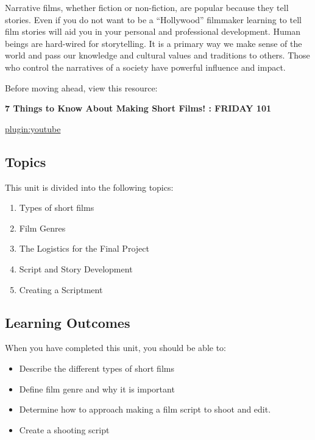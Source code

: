 \documentclass[
]{book}
\providecommand{\tightlist}{%
  \setlength{\itemsep}{0pt}\setlength{\parskip}{0pt}}
\begin{document}
Narrative films, whether fiction or non-fiction, are popular because they tell stories. Even if you do not want to be a ``Hollywood'' filmmaker learning to tell film stories will aid you in your personal and professional development. Human beings are hard-wired for storytelling. It is a primary way we make sense of the world and pass our knowledge and cultural values and traditions to others. Those who control the narratives of a society have powerful influence and impact.

Before moving ahead, view this resource:

\textbf{7 Things to Know About Making Short Films! : FRIDAY 101}

\href{https://www.youtube.com/watch?v=mYnsKATCrdw}{plugin:youtube}

\hypertarget{topics-7}{%
\subsection*{Topics}\label{topics-7}}

This unit is divided into the following topics:

\begin{enumerate}
\def\labelenumi{\arabic{enumi}.}
\tightlist
\item
  Types of short films\\
\item
  Film Genres\\
\item
  The Logistics for the Final Project\\
\item
  Script and Story Development\\
\item
  Creating a Scriptment
\end{enumerate}

\hypertarget{learning-outcomes-7}{%
\subsection*{Learning Outcomes}\label{learning-outcomes-7}}

When you have completed this unit, you should be able to:

\begin{itemize}
\tightlist
\item
  Describe the different types of short films\\
\item
  Define film genre and why it is important\\
\item
  Determine how to approach making a film script to shoot and edit.\\
\item
  Create a shooting script
\end{itemize}
\end{document}
